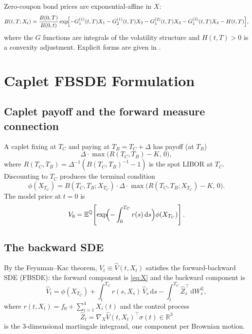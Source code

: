 \documentclass[11pt,a4paper]{article}
\newcommand{\Q}{\mathbb{Q}}
\newcommand{\E}{\mathbb{E}}
\newcommand{\R}{\mathbb{R}}
\newcommand{\dd}{\,\mathrm{d}}
\newcommand{\dW}{\dd W^{\Q}}
\begin{document}
Zero-coupon bond prices are exponential-affine in $X$:
\begin{equation}
  B(t, T; X_t) = \frac{B(0,T)}{B(0,t)}
    \exp\!\Bigl[
      -G_1^{(1)}(t,T) X_1 - G_2^{(1)}(t,T) X_2
      - G_1^{(2)}(t,T) X_3 - G_1^{(3)}(t,T) X_4
      - H(t,T)
    \Bigr],
  \label{eq:bond}
\end{equation}
where the $G$ functions are integrals of the volatility structure and
$H(t,T) > 0$ is a convexity adjustment. Explicit forms are given in
\cite{BCK2012}.

\section{Caplet FBSDE Formulation}
\label{sec:fbsde}

\subsection{Caplet payoff and the forward measure connection}

A caplet fixing at $T_C$ and paying at $T_B = T_C + \Delta$ has payoff (at
$T_B$)
\begin{equation}
  \Delta \cdot \max\bigl(R(T_C, T_B) - K,\, 0\bigr),
\end{equation}
where $R(T_C, T_B) = \Delta^{-1}(B(T_C, T_B)^{-1} - 1)$ is the spot LIBOR
at $T_C$. Discounting to $T_C$ produces the terminal condition
\begin{equation}
  \phi(X_{T_C}) = B(T_C, T_B; X_{T_C}) \cdot \Delta \cdot
    \max\!\bigl(R(T_C, T_B; X_{T_C}) - K,\, 0\bigr).
  \label{eq:terminal}
\end{equation}
The model price at $t = 0$ is
\begin{equation}
  V_0 = \E^{\Q}\!\left[\exp\!\Bigl(-\int_0^{T_C} r(s)\dd s\Bigr)
         \phi(X_{T_C})\right].
  \label{eq:price}
\end{equation}

\subsection{The backward SDE}

By the Feynman--Kac theorem, $V_t \equiv \widehat{V}(t, X_t)$ satisfies the
forward-backward SDE (FBSDE): the forward component is \eqref{eq:X} and the
backward component is
\begin{equation}
  \widehat{V}_t = \phi(X_{T_C})
    + \int_t^{T_C} r(s, X_s)\, \widehat{V}_s \dd s
    - \int_t^{T_C} \widehat{Z}_s^\top \dW_s,
  \label{eq:bsde}
\end{equation}
where $r(t, X_t) = f_0 + \sum_{i=1}^4 X_i(t)$ and the control process
\begin{equation}
  \widehat{Z}_t = \nabla_X \widehat{V}(t, X_t)^\top \sigma(t) \in \R^3
  \label{eq:Z}
\end{equation}
is the $3$-dimensional martingale integrand, one component per Brownian
motion.
\end{document}

